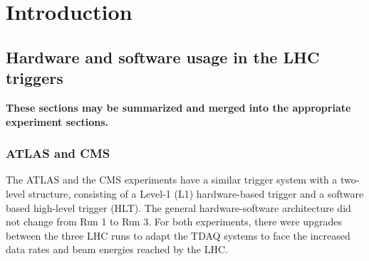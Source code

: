 \section{Introduction}




\subsection{Hardware and software usage in the LHC triggers}
\color{red} \textbf{These sections may be summarized and merged into the appropriate experiment sections.}
\color{black}

\subsubsection{ATLAS and CMS}
The ATLAS and the CMS experiments have a similar trigger system with a two-level structure, consisting of a Level-1 (L1) hardware-based trigger and a software based high-level trigger (HLT).
The general hardware-software architecture did not change from Run 1 to Run 3.
For both experiments, there were upgrades between the three LHC runs to adapt the TDAQ systems to face the increased data rates and beam energies reached by the LHC.

